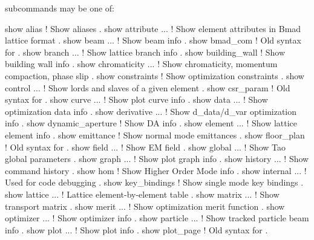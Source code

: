 {{{{{{{{ subcommands may be one of:
\begin{example}
  show alias                   ! Show aliases .
  show attribute ...           ! Show element attributes in Bmad lattice format .
  show beam ...                ! Show beam info .
  show bmad_com                ! Old syntax for  .
  show branch ...              ! Show lattice branch info .
  show building_wall           ! Show building wall info .
  show chromaticity ...        ! Show chromaticity, momentum compaction, phase slip .
  show constraints             ! Show optimization constraints .
  show control ...             ! Show lords and slaves of a given element .
  show csr_param               ! Old syntax for  .
  show curve ...               ! Show plot curve info .
  show data ...                ! Show optimization data info .
  show derivative ...          ! Show d_data/d_var optimization info .
  show dynamic_aperture        ! Show DA info .
  show element ...             ! Show lattice element info .
  show emittance               ! Show normal mode emittances .
  show floor_plan              ! Old syntax for  .
  show field ...               ! Show EM field .
  show global ...              ! Show Tao global parameters .
  show graph ...               ! Show plot graph info .
  show history ...             ! Show command history .
  show hom                     ! Show Higher Order Mode info .
  show internal ...            ! Used for code debugging .
  show key_bindings            ! Show single mode key bindings .
  show lattice ...             ! Lattice element-by-element table .
  show matrix ...              ! Show transport matrix .
  show merit ...               ! Show optimization merit function .
  show optimizer ...           ! Show optimizer info .
  show particle ...            ! Show tracked particle beam info .
  show plot ...                ! Show plot info .
  show plot_page               ! Old syntax for  .

\end{example}}}}}}}}}
